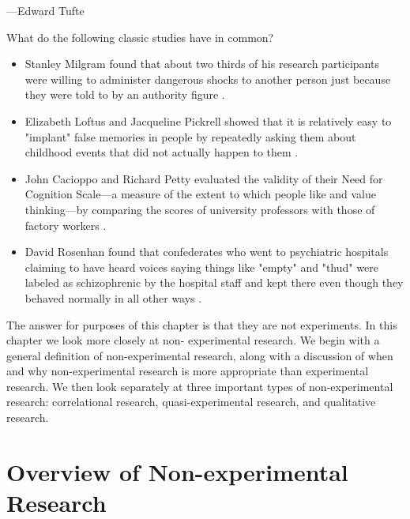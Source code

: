  {---Edward Tufte}

What do the following classic studies have in common?
\begin{itemize}
\item Stanley Milgram found that about two thirds of his research participants were willing to administer dangerous shocks to another person just because they were told to by an authority figure \citep{milgram_behavioral_1963}.
\item Elizabeth Loftus and Jacqueline Pickrell showed that it is relatively easy to "implant" false memories in people by repeatedly asking them about childhood events that did not actually happen to them \citep{loftus_formation_1995}.
\item John Cacioppo and Richard Petty evaluated the validity of their Need for Cognition Scale---a measure of the extent to which people like and value thinking---by comparing the scores of university professors with those of factory workers \citep{cacioppo_need_1982}.
\item David Rosenhan found that confederates who went to psychiatric hospitals claiming to have heard voices saying things like "empty" and "thud" were labeled as schizophrenic by the hospital staff and kept there even though they behaved normally in all other ways \citep{rosenhan_being_1973}.
\end{itemize}

The answer for purposes of this chapter is that they are not experiments. In this chapter we look more closely at non- experimental research. We begin with a general definition of non-experimental research, along with a discussion of when and why non-experimental research is more appropriate than experimental research. We then look separately at three important types of non-experimental research: correlational research, quasi-experimental research, and qualitative research.

\section{Overview of Non-experimental Research}


